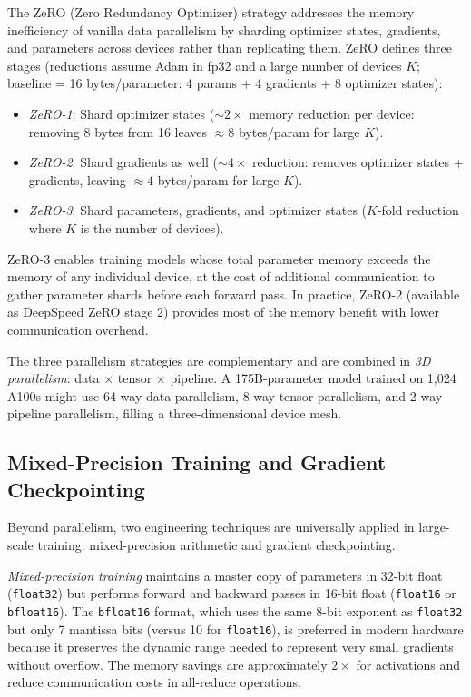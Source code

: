 \begin{deepdive}
The ZeRO (Zero Redundancy Optimizer) strategy \cite{rajbhandari2020zero}
addresses the memory inefficiency of vanilla data parallelism by sharding
optimizer states, gradients, and parameters across devices rather than
replicating them.  ZeRO defines three stages (reductions assume Adam in fp32 and a large number
of devices $K$; baseline = 16 bytes/parameter: 4 params + 4 gradients +
8 optimizer states):
\begin{itemize}
  \item \emph{ZeRO-1}: Shard optimizer states (${\sim}2\times$ memory reduction
        per device: removing 8 bytes from 16 leaves ${\approx}8$ bytes/param
        for large $K$).
  \item \emph{ZeRO-2}: Shard gradients as well (${\sim}4\times$ reduction:
        removes optimizer states + gradients, leaving ${\approx}4$ bytes/param
        for large $K$).
  \item \emph{ZeRO-3}: Shard parameters, gradients, and optimizer states
        ($K$-fold reduction where $K$ is the number of devices).
\end{itemize}
ZeRO-3 enables training models whose total parameter memory exceeds the
memory of any individual device, at the cost of additional communication
to gather parameter shards before each forward pass.  In practice, ZeRO-2
(available as DeepSpeed ZeRO stage 2) provides most of the memory benefit
with lower communication overhead.

The three parallelism strategies are complementary and are combined in
\emph{3D parallelism}: data $\times$ tensor $\times$ pipeline.  A 175B-parameter
model trained on 1{,}024 A100s might use 64-way data parallelism, 8-way tensor
parallelism, and 2-way pipeline parallelism, filling a three-dimensional
device mesh.

\subsection{Mixed-Precision Training and Gradient Checkpointing}
\label{subsec:mixed-precision}

Beyond parallelism, two engineering techniques are universally applied in
large-scale training: mixed-precision arithmetic and gradient checkpointing.

\emph{Mixed-precision training} maintains a master copy of parameters in 32-bit
float (\texttt{float32}) but performs forward and backward passes in 16-bit
float (\texttt{float16} or \texttt{bfloat16}).  The \texttt{bfloat16} format,
which uses the same 8-bit exponent as \texttt{float32} but only 7 mantissa bits
(versus 10 for \texttt{float16}), is preferred in modern hardware because it
preserves the dynamic range needed to represent very small gradients without
overflow.  The memory savings are approximately $2\times$ for activations and
reduce communication costs in all-reduce operations.


\end{deepdive}
